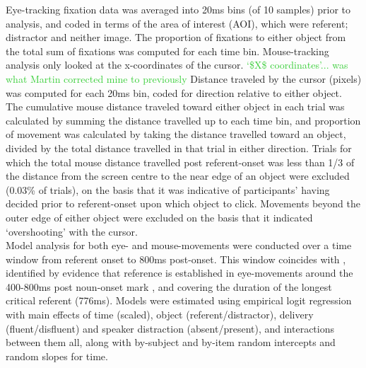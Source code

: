 \documentclass[man]{apa6}
\newcommand\thenote[1]{\textcolor{LimeGreen}{#1}}
\begin{document}
Eye-tracking fixation data was averaged into 20ms bins (of 10 samples) prior to analysis, and coded in terms of the area of interest (AOI), which were referent; distractor and neither image. 
The proportion of fixations to either object from the total sum of fixations was computed for each time bin. 
Mouse-tracking analysis only looked at the x-coordinates of the cursor. \thenote{`\$X\$ coordinates'... was what Martin corrected mine to previously} 
Distance traveled by the cursor (pixels) was computed for each 20ms bin, coded for direction relative to either object. 
The cumulative mouse distance traveled toward either object in each trial was calculated by summing the distance travelled up to each time bin, and proportion of movement was calculated by taking the distance travelled toward an object, divided by the total distance travelled in that trial in either direction. 
Trials for which the total mouse distance travelled post referent-onset was less than 1/3 of the distance from the screen centre to the near edge of an object were excluded (0.03\% of trials), on the basis that it was indicative of participants' having decided prior to referent-onset upon which object to click. 
Movements beyond the outer edge of either object were excluded on the basis that it indicated `overshooting' with the cursor.\\

Model analysis for both eye- and mouse-movements were conducted over a time window from referent onset to 800ms post-onset. 
This window coincides with \citet{Loy2016}, identified by evidence that reference is established in eye-movements around the 400-800ms post noun-onset mark \citep{Eberhard1995}, and covering the duration of the longest critical referent (776ms). 
Models were estimated using empirical logit regression \citep{Barr2008} with main effects of time (scaled), object (referent/distractor), delivery (fluent/disfluent) and speaker distraction (absent/present), and interactions between them all, along with by-subject and by-item random intercepts and random slopes for time. \\
\end{document}
